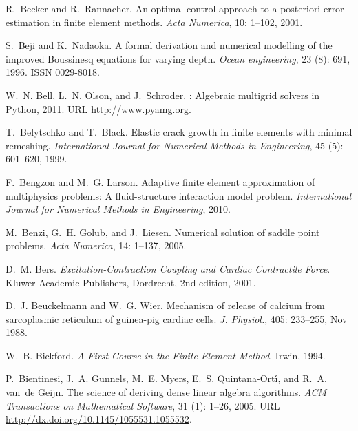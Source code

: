 \begin{thebibliography}{467}
R.~Becker and R.~Rannacher.
\newblock An optimal control approach to a posteriori error estimation in
  finite element methods.
\newblock \emph{Acta Numerica}, 10: 1--102, 2001.

S.~Beji and K.~Nadaoka.
\newblock A formal derivation and numerical modelling of the improved
  {B}oussinesq equations for varying depth.
\newblock \emph{Ocean engineering}, 23 (8): 691, 1996.
\newblock ISSN 0029-8018.

W.~N. Bell, L.~N. Olson, and J.~Schroder.
: {A}lgebraic multigrid solvers in {P}ython, 2011.
\newblock URL \url{http://www.pyamg.org}.

T.~Belytschko and T.~Black.
\newblock Elastic crack growth in finite elements with minimal remeshing.
\newblock \emph{International Journal for Numerical Methods in Engineering},
  45 (5): 601--620, 1999.

F.~Bengzon and M.~G. Larson.
\newblock Adaptive finite element approximation of multiphysics problems: {A}
  fluid-structure interaction model problem.
\newblock \emph{International Journal for Numerical Methods in Engineering},
  2010.

M.~Benzi, G.~H. Golub, and J.~Liesen.
\newblock Numerical solution of saddle point problems.
\newblock \emph{Acta Numerica}, 14: 1--137, 2005.

D.~M. Bers.
\newblock \emph{Excitation-Contraction Coupling and Cardiac Contractile Force}.
\newblock Kluwer Academic Publishers, Dordrecht, 2nd edition, 2001.

D.~J. Beuckelmann and W.~G. Wier.
\newblock Mechanism of release of calcium from sarcoplasmic reticulum of
  guinea-pig cardiac cells.
\newblock \emph{J. Physiol.}, 405: 233--255, Nov 1988.

W.~B. Bickford.
\newblock \emph{A First Course in the Finite Element Method}.
\newblock Irwin, 1994.

P.~Bientinesi, J.~A. Gunnels, M.~E. Myers, E.~S. Quintana-Ort\'{\i}, and R.~A.
  van~de Geijn.
\newblock The science of deriving dense linear algebra algorithms.
\newblock \emph{ACM Transactions on Mathematical Software}, 31
  (1): 1--26, 2005.
\newblock URL \url{http://dx.doi.org/10.1145/1055531.1055532}.


\end{thebibliography}
